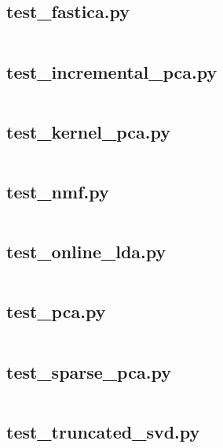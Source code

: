 \documentclass{article}
\begin{document}
\subsection{test\_fastica.py}
\inputminted{python}{/home/dufferzafar/dev/@clones/scikit-learn/sklearn/decomposition/tests/test_fastica.py}
\newpage

\subsection{test\_incremental\_pca.py}
\inputminted{python}{/home/dufferzafar/dev/@clones/scikit-learn/sklearn/decomposition/tests/test_incremental_pca.py}
\newpage

\subsection{test\_kernel\_pca.py}
\inputminted{python}{/home/dufferzafar/dev/@clones/scikit-learn/sklearn/decomposition/tests/test_kernel_pca.py}
\newpage

\subsection{test\_nmf.py}
\inputminted{python}{/home/dufferzafar/dev/@clones/scikit-learn/sklearn/decomposition/tests/test_nmf.py}
\newpage

\subsection{test\_online\_lda.py}
\inputminted{python}{/home/dufferzafar/dev/@clones/scikit-learn/sklearn/decomposition/tests/test_online_lda.py}
\newpage

\subsection{test\_pca.py}
\inputminted{python}{/home/dufferzafar/dev/@clones/scikit-learn/sklearn/decomposition/tests/test_pca.py}
\newpage

\subsection{test\_sparse\_pca.py}
\inputminted{python}{/home/dufferzafar/dev/@clones/scikit-learn/sklearn/decomposition/tests/test_sparse_pca.py}
\newpage

\subsection{test\_truncated\_svd.py}
\inputminted{python}{/home/dufferzafar/dev/@clones/scikit-learn/sklearn/decomposition/tests/test_truncated_svd.py}
\newpage
\end{document}
